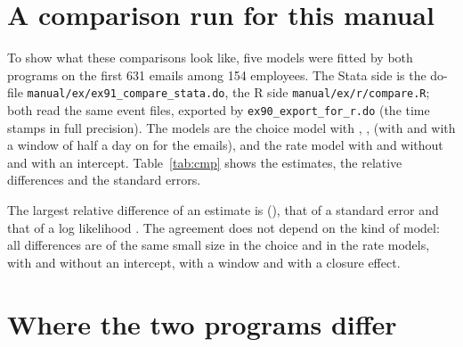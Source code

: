 \section{A comparison run for this manual}\label{sec:cmpmanual}

To show what these comparisons look like, five models were fitted by both programs on the first 631 emails among 154 employees. The Stata side is the do-file \texttt{manual/ex/\allowbreak ex91\_compare\_stata.do}, the R side \texttt{manual/ex/r/\allowbreak compare.R}; both read the same event files, exported by \texttt{ex90\_export\_for\_r.do} (the time stamps in full precision). The models are the choice model with , ,  (with  and with a window of half a day on  for the emails), and the rate model with  and  without and with an intercept. Table~\ref{tab:cmp} shows the estimates, the relative differences and the standard errors.

The largest relative difference of an estimate is \cmpMaxB{} (\cmpMaxWhere{}), that of a standard error \cmpMaxSE{} and that of a log likelihood \cmpMaxLL{}. The agreement does not depend on the kind of model: all differences are of the same small size in the choice and in the rate models, with and without an intercept, with a window and with a closure effect.

\begin{table}[ht]
\centering\small
{\setlength{\tabcolsep}{3pt}}
\caption{Estimates and standard errors of \nwdynam{} (Stata~17, macOS) and \goldfish{}~\gfver{} (R~4.6.0) on the same event logs.}\label{tab:cmp}
\end{table}

\section{Where the two programs differ}\label{sec:differs}

